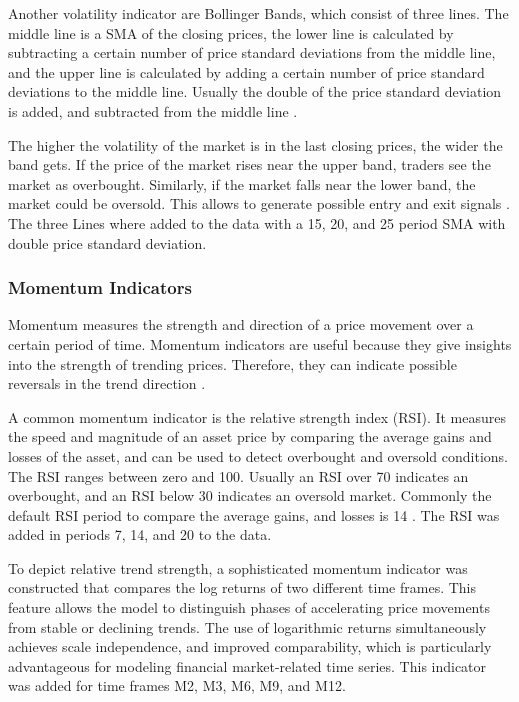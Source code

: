 Another volatility indicator are Bollinger Bands, which consist of three lines.
The middle line is a SMA of the closing prices, the lower line is calculated by subtracting a certain number of price standard deviations from the middle line, and the upper line is calculated by adding a certain number of price standard deviations to the middle line.
Usually the double of the price standard deviation is added, and subtracted from the middle line \cite{investopia-bb}.

The higher the volatility of the market is in the last closing prices, the wider the band gets.
If the price of the market rises near the upper band, traders see the market as overbought.
Similarly, if the market falls near the lower band, the market could be oversold.
This allows to generate possible entry and exit signals \cite{investopia-bb}.
The three Lines where added to the data with a 15, 20, and 25 period SMA with double price standard deviation.

\subsubsection{Momentum Indicators}

Momentum measures the strength and direction of a price movement over a certain period of time.
Momentum indicators are useful because they give insights into the strength of trending prices.
Therefore, they can indicate possible reversals in the trend direction \cite{investopia-momentum}.

A common momentum indicator is the relative strength index (RSI).
It measures the speed and magnitude of an asset price by comparing the average gains and losses of the asset, and can be used to detect overbought and oversold conditions.
The RSI ranges between zero and 100.
Usually an RSI over 70 indicates an overbought, and an RSI below 30 indicates an oversold market.
Commonly the default RSI period to compare the average gains, and losses is 14 \cite{investopia-rsi}.
The RSI was added in periods 7, 14, and 20 to the data.

To depict relative trend strength, a sophisticated momentum indicator was constructed that compares the log returns of two different time frames.
This feature allows the model to distinguish phases of accelerating price movements from stable or declining trends.
The use of logarithmic returns simultaneously achieves scale independence, and improved comparability, which is particularly advantageous for modeling financial market-related time series.
This indicator was added for time frames M2, M3, M6, M9, and M12.

